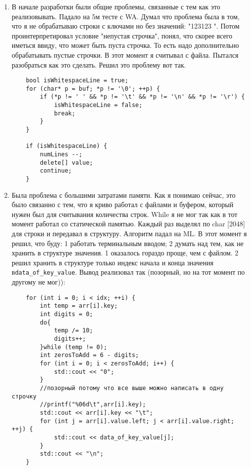 \documentclass[12pt]{article}
\begin{document}
\begin{enumerate}
    \item В начале разработки были общие проблемы, связанные с тем как это реализовывать. Падало на 5м тесте с WA. Думал что проблема была в том, что я не обрабатываю строки с ключами но без значений: "123123 ". Потом проинтерпретировал условие "непустая строчка", понял, что скорее всего иметься ввиду, что может быть пуста строчка. То есть надо дополнительно обрабатывать пустые строчки. В этот момент я считывал с файла. Пытался разобраться как это сделать. Решил это проблему вот так.
    \begin{lstlisting}
    bool isWhitespaceLine = true;
    for (char* p = buf; *p != '\0'; ++p) {
        if (*p != ' ' && *p != '\t' && *p != '\n' && *p != '\r') {
            isWhitespaceLine = false;
            break;
        }
    }

    if (isWhitespaceLine) {
        numLines --;
        delete[] value;
        continue;
    }
\end{lstlisting}
    \item Была проблема с большими затратами памяти. Как я понимаю сейчас, это было связанно с тем, что я криво работал с файлами и буфером, который нужен был для считывания количества строк. While я не мог так как в тот момент работал со статической памятью. Каждый раз выделял по char [2048] для строки и передавал в структуру. Алгоритм падал на ML. В этот момент я решил, что буду: 1 работать терминальным вводом; 2 думать над тем, как не хранить в структуре значения. 1 оказалось гораздо проще, чем с файлом. 2 решил хранить в структуре только индекс начала и конца значения в\verb|data_of_key_value|. Вывод реализовал так (позорный, но на тот момент по другому не мог)):
\begin{lstlisting}
    for (int i = 0; i < idx; ++i) {
        int temp = arr[i].key;
        int digits = 0;
        do{
            temp /= 10;
            digits++;
        }while (temp != 0);
        int zerosToAdd = 6 - digits;
        for (int i = 0; i < zerosToAdd; i++) {
            std::cout << "0";
        }
        //позорный потому что все выше можно написать в одну строчку
        //printf("%06d\t",arr[i].key);
        std::cout << arr[i].key << "\t";
        for (int j = arr[i].value.left; j < arr[i].value.right; ++j) {
            std::cout << data_of_key_value[j];
        }
        std::cout << "\n";
    }
\end{lstlisting}


\end{enumerate}
\end{document}
